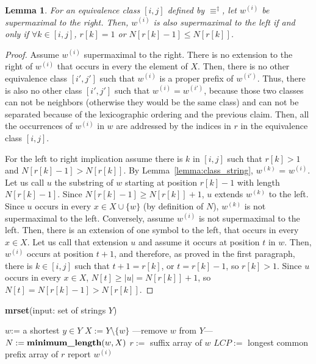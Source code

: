 \documentclass[submission]{dmtcs}
\newcommand\+[1]{\mathcal{#1}}
\newtheorem{lemma}[theorem]{Lemma}
\begin{document}
\begin{lemma} \label{lemma:maxr-l}
For an equivalence class $[i,j]$ defined by $\equiv^\ddag$, 
let $w^{(i)}$ be supermaximal to the right.
Then, $w^{(i)}$ is also  supermaximal to the left if and only if 
$\forall k \in [i,j]$, $r[k] = 1$ or $N[r[k]-1] \leq N[r[k]] $.
\end{lemma}
\begin{proof}
Assume $w^{(i)}$ supermaximal to the right. There is no extension to the right
of $w^{(i)}$ that occurs in every the element of $X$. 
Then, there is no other equivalence class $[i',j']$ 
such that $w^{(i)}$ is a proper prefix of $w^{(i')}$. Thus, there is
also no other class $[i',j']$ such that $w^{(i)} = w^{(i')}$, because those
two classes can not be neighbors (otherwise they would be the same class) and
can not be separated because of the lexicographic ordering and the previous
claim.
Then, all the occurrences of $w^{(i)}$ in $w$ 
are addressed by the indices in $r$ in the equivalence class $[i,j]$.

For the left to right implication 
assume there is $k$ in $[i,j]$ such that 
$r[k] > 1$ and $N[r[k]-1] > N[r[k]]$.
By Lemma~\ref{lemma:class_string}, $w^{(k)}$ = $w^{(i)}$. 
Let us call $u$ the substring of $w$
starting at position $r[k]-1$ with length $N[r[k]-1]$.
Since $N[r[k]-1] \geq N[r[k]]+1$, 
$u$ extends  $w^{(k)}$ to the left.
Since $u$ occurs in every $x \in X \cup \{w\}$ (by definition of $N$), 
$w^{(k)}$ is not supermaximal to the left.
%
Conversely, assume $w^{(i)}$ is not supermaximal to the left. Then, there is
an extension of one symbol to the left, that occurs in every $x \in X$. Let
us call that extension $u$ and assume it occurs at position $t$ in $w$. Then,
$w^{(i)}$ occurs at position $t+1$, and therefore, as proved in the first
paragraph, there is $k \in [i,j]$ such that $t+1 = r[k]$, or $t = r[k]-1$, so
$r[k] > 1$. Since $u$ occurs in every $x \in X$, $N[t] \geq |u| = N[r[k]]+1$,
so  $N[t] = N[r[k]-1] > N[r[k]]$.
\end{proof}


\begin{algorithm}[th]
\caption{{\bf mrset}(input: set of strings $Y$)\label{alg:mrset}}
\begin{algorithmic}
\STATE
\STATE $w $:= a shortest $y\in Y$
\STATE $X:= Y \setminus \{w\}$ ---remove $w$ from $Y$---
\STATE $N:= \text{\bf minimum\_length}(w, X)$ 
\STATE $r :=$ suffix array of $w$
\STATE $LCP :=$ longest common prefix array of $r$
			\STATE report  $w^{(i)}$
		\ENDIF
	\ENDIF
\ENDFOR
\end{algorithmic}
\end{algorithm}
\end{document}
